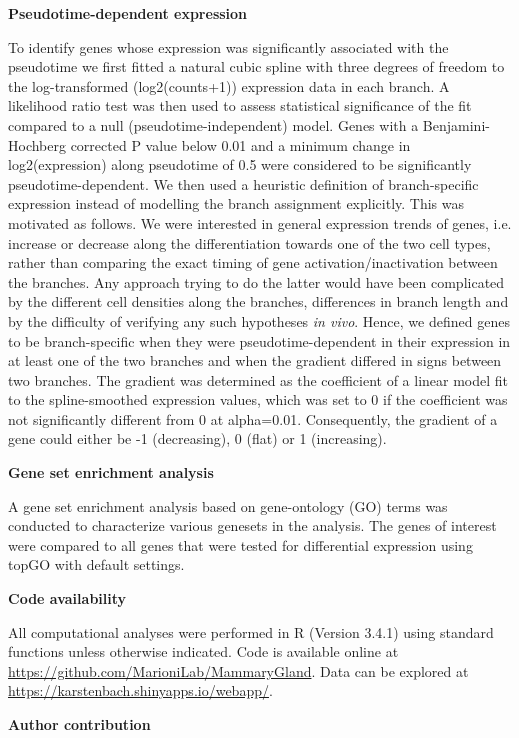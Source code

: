 \documentclass[titlepage, 12pt, oneside]{amsart}
\begin{document}
\textbf{Pseudotime-dependent expression}

To identify genes whose expression was significantly associated with the pseudotime we first fitted a natural cubic spline with three degrees of freedom to the log-transformed (log2(counts+1)) expression data in each branch.
A likelihood ratio test was then used to assess statistical significance of the fit compared to a null (pseudotime-independent) model.
Genes with a Benjamini-Hochberg corrected P value below 0.01 and a minimum change in log2(expression) along pseudotime of 0.5 were considered to be significantly pseudotime-dependent.
We then used a heuristic definition of branch-specific expression instead of modelling the branch assignment explicitly.
This was motivated as follows.
We were interested in general expression trends of genes, i.e. increase or decrease along the differentiation towards one of the two cell types, rather than comparing the exact timing of gene activation/inactivation between the branches.
Any approach trying to do the latter would have been complicated by the different cell densities along the branches, differences in branch length and by the difficulty of verifying any such hypotheses \textit{in vivo}.
Hence, we defined genes to be branch-specific when they were pseudotime-dependent in their expression in at least one of the two branches and when the gradient differed in signs between two branches.
The gradient was determined as the coefficient of a linear model fit to the spline-smoothed expression values, which was set to 0 if the coefficient was not significantly different from 0 at alpha=0.01.
Consequently, the gradient of a gene could either be -1 (decreasing), 0 (flat) or 1 (increasing).

\textbf{Gene set enrichment analysis}

A gene set enrichment analysis based on gene-ontology (GO) terms was conducted to characterize various genesets in the analysis.
The genes of interest were compared to all genes that were tested for differential expression using topGO with default settings\autocite{Alexa2016}.

\textbf{Code availability}

All computational analyses were performed in R (Version 3.4.1) using standard functions unless otherwise indicated.
Code is available online at \url{https://github.com/MarioniLab/MammaryGland}.
Data can be explored at \url{https://karstenbach.shinyapps.io/webapp/}.

\textbf{Author contribution}
\end{document}
